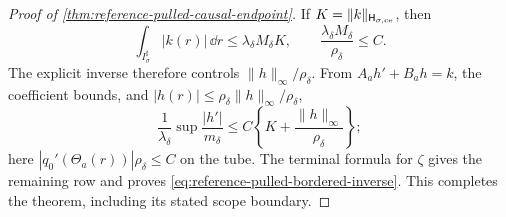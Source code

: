 \begin{proof}[Proof of
\cref{thm:reference-pulled-causal-endpoint}]
If \(K=\|k\|_{\mathsf H_{\sigma,{\rm ce}}}\), then
\[
 \int_{I_\sigma^\sharp}|k(r)|\,\dd r
 \le \lambda_\delta M_\delta K,
 \qquad
 \frac{\lambda_\delta M_\delta}{\rho_\delta}\le C.
\]
The explicit inverse therefore controls
\(\|h\|_\infty/\rho_\delta\).  From
\(A_ah'+B_ah=k\), the coefficient bounds, and
\(|h(r)|\le\rho_\delta\|h\|_\infty/\rho_\delta\),
\begin{equation*}
 \frac1{\lambda_\delta}
 \sup\frac{|h'|}{m_\delta}
 \le C\left\{K+\frac{\|h\|_\infty}{\rho_\delta}\right\};
\end{equation*}
here \(|q_0'(\Theta_a(r))|\rho_\delta\le C\) on the tube.
The terminal formula for \(\zeta\) gives the remaining row and proves
\cref{eq:reference-pulled-bordered-inverse}.  This completes the theorem,
including its stated scope boundary.
\end{proof}

